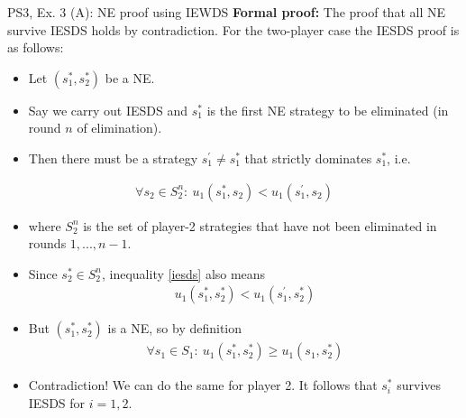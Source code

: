 \begin{frame}{PS3, Ex. 3 (A): NE proof using IEWDS}
    \textbf{Formal proof:} The proof that all NE survive IESDS holds by contradiction. For the two-player case the IESDS proof is as follows:
  \begin{multicols}{2}
    \begin{itemize}
      \item Let $(s_1^{*},s_2^{*})$ be a NE.
      \item Say we carry out IESDS and $s_1^{*}$ is the first NE strategy to be eliminated (in round $n$ of elimination).
      \item Then there must be a strategy $s_1^{'}\neq s_1^{*}$ that strictly dominates $s_1^{*}$, i.e.
    \end{itemize}
      \begin{align}
        \forall s_2\in S_2^n:\ u_1(s_1^{*},s_2)<u_1(s_1^{'},s_2)\label{iesds}
      \end{align}
      \begin{itemize}
        \item[] where $S_2^n$ is the set of player-2 strategies that have not been eliminated in rounds $1,...,n-1$.
      \end{itemize}
  \vfill\null\columnbreak
    \begin{itemize}
      \item Since $s_2^{*}\in S_2^n$, inequality \eqref{iesds} also means
      \begin{align*}
        u_1(s_1^{*},s_2^{*})<u_1(s_1^{'},s_2^{*})
      \end{align*}
      \item But $(s_1^{*},s_2^{*})$ is a NE, so by definition
      \begin{align*}
        \forall s_1\in S_1:\ u_1(s_1^{*},s_2^{*})\geq u_1(s_1,s_2^{*})
      \end{align*}
      \item Contradiction! We can do the same for player 2. It follows that $s_i^{*}$ survives IESDS for $i=1,2$.
    \end{itemize}
  \vfill\null
  \end{multicols}
\end{frame}
